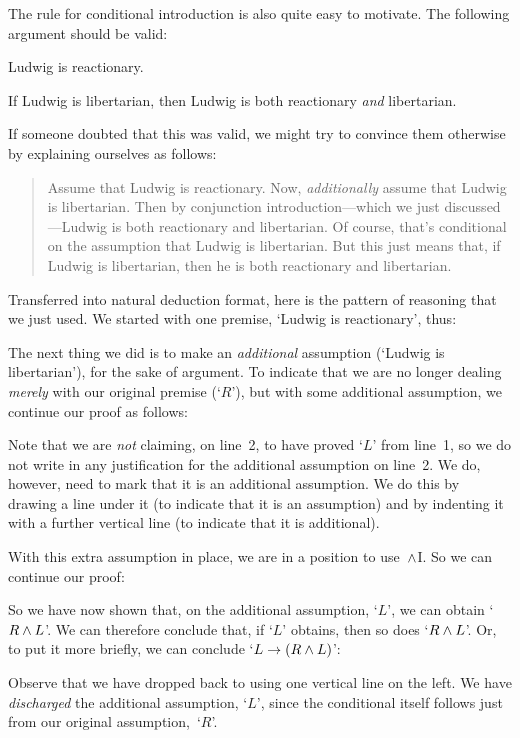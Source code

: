 The rule for conditional introduction is also quite easy to motivate. The following argument should be valid:
	\begin{earg}
		\item Ludwig is reactionary. 
		\item[\texttherefore] If Ludwig is libertarian, then Ludwig is both reactionary \emph{and} libertarian.
	\end{earg}
If someone doubted that this was valid, we might try to convince them otherwise by explaining ourselves as follows:
	\begin{quote}
		Assume that Ludwig is reactionary. Now, \emph{additionally} assume that Ludwig is libertarian. Then by conjunction introduction---which we just discussed---Ludwig is both reactionary and libertarian. Of course, that's conditional on the assumption that Ludwig is libertarian. But this just means that, if Ludwig is libertarian, then he is both reactionary and libertarian.
	\end{quote}
Transferred into natural deduction format, here is the pattern of reasoning that we just used. We started with one premise, `Ludwig is reactionary', thus:
	\begin{fitchproof}
		\PR
	\end{fitchproof}
The next thing we did is to make an \emph{additional} assumption (`Ludwig is libertarian'), for the sake of argument. To indicate that we are no longer dealing \emph{merely} with our original premise (`$R$'), but with some additional assumption, we continue our proof as follows:
	\begin{fitchproof}
		\hypo{r}{R}\PR
		\open
			\hypo{l}{L}\AS
	\end{fitchproof}
Note that we are \emph{not} claiming, on line~2, to have proved
`$L$' from line~1, so we do not write in any justification for the
additional assumption on line~2. We do, however, need to mark that
it is an additional assumption. We do this by drawing a line under it
(to indicate that it is an assumption) and by indenting it with a
further vertical line (to indicate that it is additional).

With this extra assumption in place, we are in a position to
use~$\wedge$I. So we can continue our proof:
	\begin{fitchproof}
		\PR
		\open
			\AS
			\ai{r, l}
	\end{fitchproof}
So we have now shown that, on the additional assumption, `$L$', we can obtain `$R \wedge L$'. We can therefore conclude that, if `$L$' obtains, then so does `$R \wedge L$'. Or, to put it more briefly, we can conclude `$L \rightarrow (R \wedge L)$':
	\begin{fitchproof}
		\hypo{r}{R}\PR
		\open
			\hypo{l}{L}\AS
			\ai{r, l}
			\close
		\ci{l-rl}
	\end{fitchproof}
Observe that we have dropped back to using one vertical line on the left.  We have \emph{discharged} the additional assumption, `$L$', since the conditional itself follows just from our original assumption,~`$R$'.

